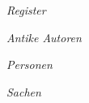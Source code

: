 \emptyEvenPage
\startpart[title={Register}]

\startsetups[b]
  \switchtobodyfont[default]
  \rlap{\pagenumber}
  \hfill
  {\tfx\it Register}
  \hfill
  \llap{}
\stopsetups

 \subject{Antike Autoren}
 
 \startsetups[a]
   \switchtobodyfont[default]
   \rlap{}
   \hfill
   {\tfx\it Antike Autoren}
   \hfill
   \llap{\pagenumber}
 \stopsetups
 
 {\startcolumns
 \placeantIndex
 \stopcolumns}
 
 
% 
% 

 \subject{Personen}
 
 \startsetups[a]
   \switchtobodyfont[default]
   \rlap{}
   \hfill
   {\tfx\it Personen}
   \hfill
   \llap{\pagenumber}
 \stopsetups
 
 \startcolumns
 \placepersIndex
 \stopcolumns
 
 \subject{Sachen}
 
 \startsetups[a]
   \switchtobodyfont[default]
   \rlap{}
   \hfill
  {\tfx\it Sachen}
   \hfill
   \llap{\pagenumber}
 \stopsetups

 {\startcolumns
 \placesachIndex
 \stopcolumns}

\stoppart
\stoptext
